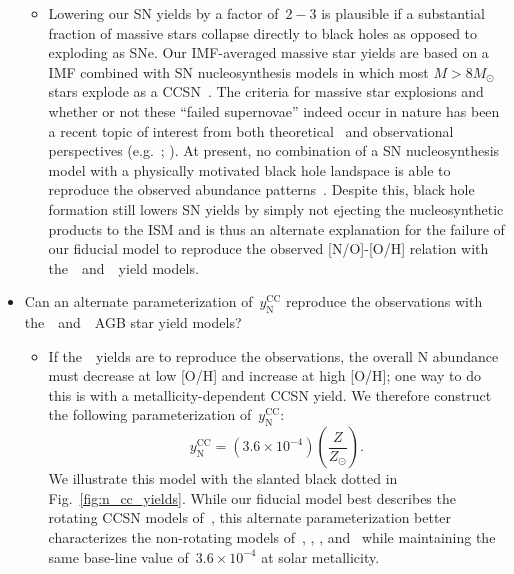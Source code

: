\documentclass[ms.tex]{subfiles}
\begin{document}
\begin{itemize}
\begin{itemize}
		\item Lowering our SN yields by a factor of~$2-3$ is plausible if a
		substantial fraction of massive stars collapse directly to black holes
		as opposed to exploding as SNe.
		Our IMF-averaged massive star yields are based on a~\citet{Kroupa2001}
		IMF combined with SN nucleosynthesis models in which most
		$M > 8 M_\odot$ stars explode as a CCSN~\citep[e.g.][]{Woosley1995,
		Chieffi2004, Chieffi2013, Limongi2006, Nomoto2013}.
		The criteria for massive star explosions and whether or not these 
		``failed supernovae'' indeed occur in nature has been a recent topic of
		interest from both theoretical~\citep[e.g.][]{Pejcha2015, Sukhbold2016,
		Ertl2016} and observational perspectives (e.g.~\citealp*{Gerke2015};
		\citealp{Adams2017, Basinger2021}).
		At present, no combination of a SN nucleosynthesis model with a
		physically motivated black hole landspace is able to reproduce the
		observed abundance patterns~\citep{Griffith2021}.
		Despite this, black hole formation still lowers SN yields by simply
		not ejecting the nucleosynthetic products to the ISM and is thus an
		alternate explanation for the failure of our fiducial model to
		reproduce the observed [N/O]-[O/H] relation with
		the~\cristallo~and~\ventura~yield models.
	\end{itemize}

	\item Can an alternate parameterization of~$y_\text{N}^\text{CC}$ reproduce 
	the observations with the~\karakasten~and~\karakas~AGB star yield models? 
	\begin{itemize} 
		\item If the~\karakasten~yields are to reproduce the observations, the 
		overall N abundance must decrease at low [O/H] and increase at high 
		[O/H]; one way to do this is with a metallicity-dependent CCSN yield. 
		We therefore construct the following parameterization 
		of~$y_\text{N}^\text{CC}$: 
		\begin{equation} 
		y_\text{N}^\text{CC} = (3.6\times10^{-4})\left(\frac{Z}{Z_\odot}\right). 
		\label{eq:linear_yncc} 
		\end{equation} 
		We illustrate this model with the slanted black dotted in 
		Fig.~\ref{fig:n_cc_yields}. 
		While our fiducial model best describes the rotating CCSN models 
		of~\citet{Limongi2018}, this alternate parameterization better 
		characterizes the non-rotating models of~\citet{Limongi2018}, 
		\citet{Sukhbold2016}, \citet{Nomoto2013}, and~\citet{Woosley1995} while 
		maintaining the same base-line value of~$3.6\times10^{-4}$ at solar 
		metallicity. 


\end{itemize}
\end{itemize}
\end{document}
